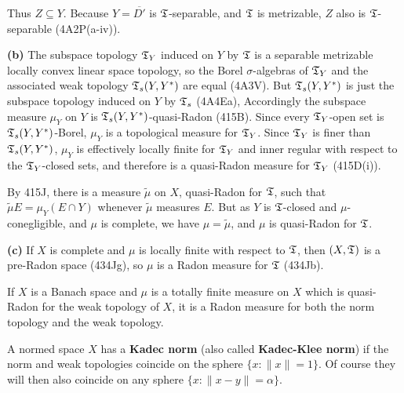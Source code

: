 {Thus $Z\subseteq Y$.   Because $Y=\overline{D'}$ is $\frak T$-separable,
and $\frak T$ is metrizable, $Z$ also is $\frak T$-separable
(4A2P(a-iv)).

\medskip

{\bf (b)} The subspace topology $\frak T_Y$ induced on $Y$ by $\frak T$
is a separable metrizable locally convex linear space topology, so the
Borel $\sigma$-algebras of $\frak T_Y$ and the associated weak topology
$\frak T_s(Y,Y^*)$ are equal (4A3V).   But $\frak T_s(Y,Y^*)$ is
just the subspace topology induced on $Y$ by $\frak T_s$ (4A4Ea),
Accordingly the subspace measure $\mu_Y$ on $Y$ is
$\frak T_s(Y,Y^*)$-quasi-Radon (415B).   Since every $\frak T_Y$-open
set is $\frak T_s(Y,Y^*)$-Borel, $\mu_Y$ is a topological measure for
$\frak T_Y$.   Since $\frak T_Y$ is finer than $\frak T_s(Y,Y^*)$,
$\mu_Y$ is effectively locally finite for $\frak T_Y$ and inner regular
with respect to the $\frak T_Y$-closed sets, and therefore is a
quasi-Radon measure for $\frak T_Y$ (415D(i)).

By 415J, there is a measure $\tilde\mu$ on $X$, quasi-Radon for
$\frak T$, such that $\tilde\mu E=\mu_Y(E\cap Y)$ whenever $\tilde\mu$
measures $E$.   But as $Y$ is $\frak T$-closed and $\mu$-conegligible,
and $\mu$ is complete, we have $\mu=\tilde\mu$, and $\mu$ is quasi-Radon
for $\frak T$.

\medskip

{\bf (c)} If $X$ is complete and $\mu$ is locally finite with respect to
$\frak T$, then $(X,\frak T)$ is a pre-Radon space (434Jg), so $\mu$ is
a Radon measure for $\frak T$ (434Jb).
}%

  If $X$ is a Banach
space and $\mu$ is a totally
finite measure on $X$ which is quasi-Radon for the weak topology of $X$,
it is a Radon measure for both the norm topology and the weak topology.



 A normed space $X$ has a {\bf Kadec norm}
(also called {\bf Kadec-Klee norm}) if
the norm and weak topologies coincide on the sphere $\{x:\|x\|=1\}$.
Of course they will then also coincide on any sphere
$\{x:\|x-y\|=\alpha\}$.

